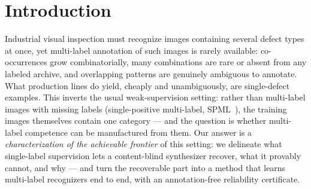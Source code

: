 \documentclass[11pt]{article}
\begin{document}
\begin{abstract}
cannot identify---\emph{proves} the latter a minimax \emph{impossibility}
(no content-blind synthesizer beats the appearance floor $A^\star(S)$, which independent-source
synthesis attains up to a factor two, exactly in the canonical case) and thereby delivers a
two-sided \emph{characterization}: a recovery
trichotomy (full / partial-up-to-an-appearance-floor / fail) matching every measured
outcome. Blind synthesis even
\emph{exceeds} a fully-supervised oracle on held-out MultiMNIST combinations
($+0.198$ mAP); the same criterion predicts the counterintuitive Reuters text
averaging-flip and the FSD50K audio summation ranking; and natural images (VOC)
mark the boundary where content-blind synthesis fails and location supervision
becomes necessary.
\end{abstract}

\section{Introduction}\label{sec:intro}

Industrial visual inspection must recognize images containing several defect
types at once, yet multi-label annotation of such images is rarely
available: co-occurrences grow combinatorially, many combinations are rare
or absent from any labeled archive, and overlapping patterns are genuinely
ambiguous to annotate. What production lines do yield, cheaply and
unambiguously, are single-defect examples. This inverts the usual
weak-supervision setting: rather than multi-label images with missing labels
(single-positive multi-label, SPML~\cite{cole2021spml,kim2022largeloss}),
the training images themselves contain one category --- and the question is
whether multi-label competence can be manufactured from them. Our answer is a
\emph{characterization of the achievable frontier} of this setting: we delineate what
single-label supervision lets a content-blind synthesizer recover, what it provably
cannot, and why --- and turn the recoverable part into a method that learns multi-label
recognizers end to end, with an annotation-free reliability certificate.
\end{document}
